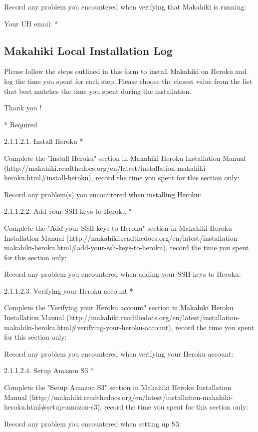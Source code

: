 Record any problem you encountered when verifying that Makahiki is running:

Your UH email: *

\subsection{Makahiki Local Installation Log}

Please follow the steps outlined in this form to install Makahiki on Heroku and log the time you spent for each step.
Please choose the closest value from the list that best matches the time you spent during the installation.

Thank you !

* Required

2.1.1.2.1. Install Heroku *

Complete the "Install Heroku" section in Makahiki Heroku Installation Manual (http://makahiki.readthedocs.org/en/latest/installation-makahiki-heroku.html\#install-heroku), record the time you spent for this section only:

Record any problem(s) you encountered when installing Heroku:

2.1.1.2.2. Add your SSH keys to Heroku *

Complete the "Add your SSH keys to Heroku" section in Makahiki Heroku Installation Manual (http://makahiki.readthedocs.org/en/latest/installation-makahiki-heroku.html\#add-your-ssh-keys-to-heroku), record the time you spent for this section only:

Record any problem you encountered when adding your SSH keys to Heroku:

2.1.1.2.3. Verifying your Heroku account *

Complete the "Verifying your Heroku account" section in Makahiki Heroku Installation Manual (http://makahiki.readthedocs.org/en/latest/installation-makahiki-heroku.html\#verifying-your-heroku-account), record the time you spent for this section only:

Record any problem you encountered when verifying your Heroku account:

2.1.1.2.4. Setup Amazon S3 *

Complete the "Setup Amazon S3" section in Makahiki Heroku Installation Manual (http://makahiki.readthedocs.org/en/latest/installation-makahiki-heroku.html\#setup-amazon-s3), record the time you spent for this section only:

Record any problem you encountered when setting up S3:

